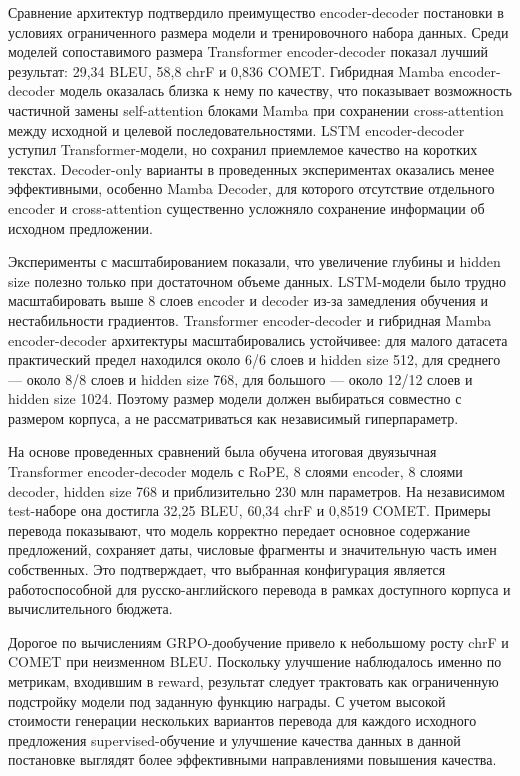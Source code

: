 Сравнение архитектур подтвердило преимущество encoder-decoder постановки в условиях ограниченного размера модели и тренировочного набора данных. Среди моделей сопоставимого размера Transformer encoder-decoder показал лучший результат: 29{,}34 BLEU, 58{,}8 chrF и 0{,}836 COMET. Гибридная Mamba encoder-decoder модель оказалась близка к нему по качеству, что показывает возможность частичной замены self-attention блоками Mamba при сохранении cross-attention между исходной и целевой последовательностями. LSTM encoder-decoder уступил Transformer-модели, но сохранил приемлемое качество на коротких текстах. Decoder-only варианты в проведенных экспериментах оказались менее эффективными, особенно Mamba Decoder, для которого отсутствие отдельного encoder и cross-attention существенно усложняло сохранение информации об исходном предложении.

Эксперименты с масштабированием показали, что увеличение глубины и hidden size полезно только при достаточном объеме данных. LSTM-модели было трудно масштабировать выше 8 слоев encoder и decoder из-за замедления обучения и нестабильности градиентов. Transformer encoder-decoder и гибридная Mamba encoder-decoder архитектуры масштабировались устойчивее: для малого датасета практический предел находился около 6/6 слоев и hidden size 512, для среднего --- около 8/8 слоев и hidden size 768, для большого --- около 12/12 слоев и hidden size 1024. Поэтому размер модели должен выбираться совместно с размером корпуса, а не рассматриваться как независимый гиперпараметр.

На основе проведенных сравнений была обучена итоговая двуязычная Transformer encoder-decoder модель с RoPE, 8 слоями encoder, 8 слоями decoder, hidden size 768 и приблизительно 230 млн параметров. На независимом test-наборе она достигла 32{,}25 BLEU, 60{,}34 chrF и 0{,}8519 COMET. Примеры перевода показывают, что модель корректно передает основное содержание предложений, сохраняет даты, числовые фрагменты и значительную часть имен собственных. Это подтверждает, что выбранная конфигурация является работоспособной для русско-английского перевода в рамках доступного корпуса и вычислительного бюджета.

Дорогое по вычислениям GRPO-дообучение привело к небольшому росту chrF и COMET при неизменном BLEU. Поскольку улучшение наблюдалось именно по метрикам, входившим в reward, результат следует трактовать как ограниченную подстройку модели под заданную функцию награды. С учетом высокой стоимости генерации нескольких вариантов перевода для каждого исходного предложения supervised-обучение и улучшение качества данных в данной постановке выглядят более эффективными направлениями повышения качества.

